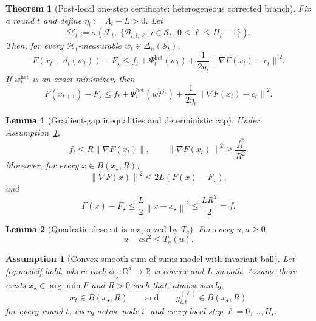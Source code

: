 \documentclass[10pt,a4paper]{amsart}
\newtheorem{theorem}{Theorem}
\newtheorem{lemma}{Lemma}
\newtheorem{assumption}{Assumption}
\newcommand{\RR}{\mathbb R}
\newcommand{\norm}[1]{\left\lVert #1\right\rVert}
\begin{document}
\begin{theorem}[Post-local one-step certificate: heterogeneous corrected branch]
\label{th:realized-het-one-step}
Fix a round $t$ and define $\eta_t:=\Lambda_t-L>0$. Let
\[
\mathcal H_t
:=
\sigma\!\left(
\mathcal F_t,\ \{\mathcal B_{i,t,\ell}:i\in\mathcal S_t,\ 0\le \ell\le H_i-1\}
\right).
\]
Then, for every $\mathcal H_t$-measurable $w_t\in\Delta_n(\mathcal S_t)$,
\begin{equation}
F(x_t+d_t(w_t))-F_\star
\le
f_t+\Psi_t^{\mathrm{het}}(w_t)+\frac{1}{2\eta_t}\norm{\nabla F(x_t)-c_t}^2.
\label{eq:realized-het-pathwise}\end{equation}
If $w_t^{\mathrm{het}}$ is an exact minimizer, then
\[
F(x_{t+1})-F_\star\le f_t+\Psi_t^{\mathrm{het}}(w_t^{\mathrm{het}})+\frac{1}{2\eta_t}\norm{\nabla F(x_t)-c_t}^2.
\]
\end{theorem}

\begin{lemma}[Gradient-gap inequalities and deterministic cap]
\label{lem:gap}
Under Assumption~\ref{ass:model},
\begin{equation}
f_t\le R\norm{\nabla F(x_t)},
\qquad
\norm{\nabla F(x_t)}^2\ge \frac{f_t^2}{R^2}.
\label{eq:gap-lower-app}\end{equation}
Moreover, for every $x\in B(x_\star,R)$,
\begin{equation}
\norm{\nabla F(x)}^2\le 2L(F(x)-F_\star),
\label{eq:gap-upper-app}\end{equation}
and
\begin{equation}
F(x)-F_\star\le \frac{L}{2}\norm{x-x_\star}^2\le \frac{LR^2}{2}=\bar f.
\label{eq:gap-cap-app}\end{equation}
\end{lemma}

\begin{lemma}[Quadratic descent is majorized by $T_a$]
\label{lem:Ta-majorizes}
For every $u,a\ge 0$,
\[
u-a u^2\le T_a(u).\]
\end{lemma}

\begin{assumption}[Convex smooth sum-of-sums model with invariant ball]
\label{ass:model}
Let \eqref{eq:model} hold, where each $\phi_{ij}:\RR^d\to\RR$ is convex and $L$-smooth. Assume there exists $x_\star\in\arg\min F$ and $R>0$ such that, almost surely,
\[
x_t\in B(x_\star,R)
\qquad\text{and}\qquad
y_{i,t}^{(\ell)}\in B(x_\star,R)\]
for every round $t$, every active node $i$, and every local step $\ell=0,\dots,H_i$.
\end{assumption}
\end{document}
